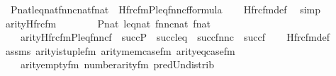 \begin{isabellebody}
\ \ {\isachardoublequoteopen}{\isasymlbrakk}P{\isasymin}nat{\isacharsemicolon}{\kern0pt}leq{\isasymin}nat{\isacharsemicolon}{\kern0pt}fnnc{\isasymin}nat{\isacharsemicolon}{\kern0pt}f{\isasymin}nat{\isasymrbrakk}\ {\isasymLongrightarrow}\ Hfrc{\isacharunderscore}{\kern0pt}fm{\isacharparenleft}{\kern0pt}P{\isacharcomma}{\kern0pt}leq{\isacharcomma}{\kern0pt}fnnc{\isacharcomma}{\kern0pt}f{\isacharparenright}{\kern0pt}{\isasymin}formula{\isachardoublequoteclose}\isanewline
%
\isadelimproof
\ \ %
\endisadelimproof
%
\isatagproof
{}\isamarkupfalse%
\ Hfrc{\isacharunderscore}{\kern0pt}fm{\isacharunderscore}{\kern0pt}def\ \isamarkupfalse%
\ simp%
\endisatagproof
{\isafoldproof}%
%
\isadelimproof
\isanewline
%
\endisadelimproof
\isanewline
{}\isamarkupfalse%
\ arity{\isacharunderscore}{\kern0pt}Hfrc{\isacharunderscore}{\kern0pt}fm\ {\isacharcolon}{\kern0pt}\isanewline
\ \ \isanewline
\ \ \ \ {\isachardoublequoteopen}P{\isasymin}nat{\isachardoublequoteclose}\ {\isachardoublequoteopen}leq{\isasymin}nat{\isachardoublequoteclose}\ {\isachardoublequoteopen}fnnc{\isasymin}nat{\isachardoublequoteclose}\ {\isachardoublequoteopen}f{\isasymin}nat{\isachardoublequoteclose}\isanewline
\ \ \isanewline
\ \ \ \ {\isachardoublequoteopen}arity{\isacharparenleft}{\kern0pt}Hfrc{\isacharunderscore}{\kern0pt}fm{\isacharparenleft}{\kern0pt}P{\isacharcomma}{\kern0pt}leq{\isacharcomma}{\kern0pt}fnnc{\isacharcomma}{\kern0pt}f{\isacharparenright}{\kern0pt}{\isacharparenright}{\kern0pt}\ {\isacharequal}{\kern0pt}\ succ{\isacharparenleft}{\kern0pt}P{\isacharparenright}{\kern0pt}\ {\isasymunion}\ succ{\isacharparenleft}{\kern0pt}leq{\isacharparenright}{\kern0pt}\ {\isasymunion}\ succ{\isacharparenleft}{\kern0pt}fnnc{\isacharparenright}{\kern0pt}\ {\isasymunion}\ succ{\isacharparenleft}{\kern0pt}f{\isacharparenright}{\kern0pt}{\isachardoublequoteclose}\isanewline
%
\isadelimproof
\ \ %
\endisadelimproof
%
\isatagproof
{}\isamarkupfalse%
\ Hfrc{\isacharunderscore}{\kern0pt}fm{\isacharunderscore}{\kern0pt}def\isanewline
\ \ \isamarkupfalse%
\ assms\ arity{\isacharunderscore}{\kern0pt}is{\isacharunderscore}{\kern0pt}tuple{\isacharunderscore}{\kern0pt}fm\ arity{\isacharunderscore}{\kern0pt}mem{\isacharunderscore}{\kern0pt}case{\isacharunderscore}{\kern0pt}fm\ arity{\isacharunderscore}{\kern0pt}eq{\isacharunderscore}{\kern0pt}case{\isacharunderscore}{\kern0pt}fm\isanewline
\ \ \ \ arity{\isacharunderscore}{\kern0pt}empty{\isacharunderscore}{\kern0pt}fm\ number{}arity{\isacharunderscore}{\kern0pt}{\isacharunderscore}{\kern0pt}fm\ pred{\isacharunderscore}{\kern0pt}Un{\isacharunderscore}{\kern0pt}distrib\isanewline

\end{isabellebody}
